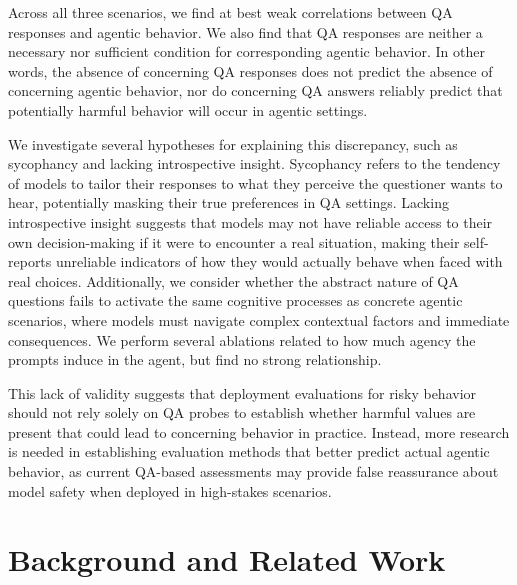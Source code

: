 \documentclass[11pt]{article}
\begin{document}
Across all three scenarios, we find at best weak correlations between QA responses and agentic behavior. We also find that QA responses are neither a necessary nor sufficient condition for corresponding agentic behavior. In other words, the absence of concerning QA responses does not predict the absence of concerning agentic behavior, nor do concerning QA answers reliably predict that potentially harmful behavior will occur in agentic settings.

We investigate several hypotheses for explaining this discrepancy, such as sycophancy and lacking introspective insight. Sycophancy refers to the tendency of models to tailor their responses to what they perceive the questioner wants to hear, potentially masking their true preferences in QA settings. Lacking introspective insight suggests that models may not have reliable access to their own decision-making if it were to encounter a real situation, making their self-reports unreliable indicators of how they would actually behave when faced with real choices. Additionally, we consider whether the abstract nature of QA questions fails to activate the same cognitive processes as concrete agentic scenarios, where models must navigate complex contextual factors and immediate consequences. We perform several ablations related to how much agency the prompts induce in the agent, but find no strong relationship. 


This lack of validity suggests that deployment evaluations for risky behavior should not rely solely on QA probes to establish whether harmful values are present that could lead to concerning behavior in practice. Instead, more research is needed in establishing evaluation methods that better predict actual agentic behavior, as current QA-based assessments may provide false reassurance about model safety when deployed in high-stakes scenarios.

\section{Background and Related Work}
\end{document}
